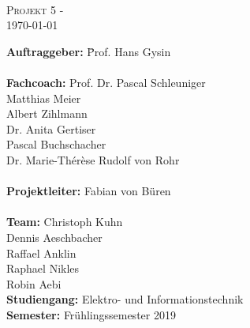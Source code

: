 \documentclass[final]{fhnwreport}       %
\begin{document}
	\begin{center}
		\vspace*{2cm}
		{\huge{\textbf{\thetitle}}}\\
		\vspace*{0.5cm}
		
		{\scshape\Large Projekt 5 - \theauthor \\} \Large{\today}
		\vfill
		\begin{normalsize}
			{\begin{tabbing}
					\textbf{Auftraggeber:} \hspace{5cm}\= Prof. Hans Gysin\\
					
					\\[0.8cm]
					\textbf{Fachcoach:} 
					\>Prof. Dr. Pascal Schleuniger\\
					\>Matthias Meier\\
					\>Albert Zihlmann\\
					\>Dr. Anita Gertiser\\
					\>Pascal Buchschacher\\
					\>Dr. Marie-Thérèse Rudolf von Rohr\\
					
					\\[0.4cm]
					\textbf{Projektleiter:} \>Fabian von Büren\\
					\\[0.4cm]
					
					\textbf{Team:} \>Christoph Kuhn \\ \>Dennis Aeschbacher \\ \>Raffael Anklin \\ \>Raphael Nikles \\ \>Robin Aebi
					\\[0.8cm]
					\textbf{Studiengang:} \>Elektro- und Informationstechnik
					\\[0.8cm]	\textbf{Semester:} \>Frühlingssemester 2019
			\end{tabbing}}
		\end{normalsize}
		\vfill
	\end{center}
\clearpage


\tableofcontents
\clearpage


	
	
	
\pagebreak
\end{document}
